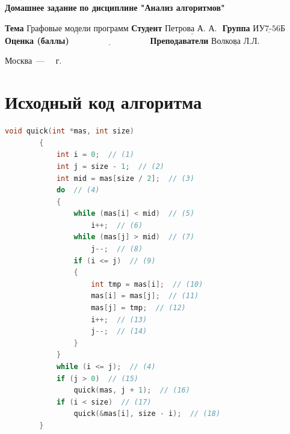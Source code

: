\documentclass[12pt]{report}
\begin{document}
\begin{titlepage}
		
		\begin{center}
			\noindent\begin{minipage}{1.3\textwidth}\centering
				\Large\textbf{Домашнее задание}\newline
				\textbf{по дисциплине "Анализ алгоритмов"}\newline\newline
			\end{minipage}
		\end{center}
		
		\noindent\textbf{Тема} $\underline{\text{Графовые модели программ}}$\newline\newline
		\noindent\textbf{Студент} $\underline{\text{Петрова А. А. }}$\newline\newline
		\noindent\textbf{Группа} $\underline{\text{ИУ7-56Б}}$\newline\newline
		\noindent\textbf{Оценка (баллы)} $\underline{\text{~~~~~~~~~~~~~~~~~~~~~~~~~~~}}$\newline\newline
		\noindent\textbf{Преподаватели} $\underline{\text{Волкова Л.Л.}}$\newline\newline\newline
		
		\begin{center}
			\vfill
			Москва~---~\the\year
			~г.
		\end{center}
	\end{titlepage}
	
	
	\tableofcontents
	
	\newpage
	\chapter{Исходный код алгоритма}
	
	\begin{lstlisting}[label=some-code,caption=Функция быстрой сортировки массива целых чисел, language=C]
		void quick(int *mas, int size)
		{
			int i = 0;  // (1)
			int j = size - 1;  // (2)
			int mid = mas[size / 2];  // (3)
			do  // (4)
			{
				while (mas[i] < mid)  // (5)
					i++;  // (6)
				while (mas[j] > mid)  // (7)
					j--;  // (8)
				if (i <= j)  // (9)
				{
					int tmp = mas[i];  // (10)
					mas[i] = mas[j];  // (11)
					mas[j] = tmp;  // (12)
					i++;  // (13)
					j--;  // (14)
				}
			}
			while (i <= j);  // (4)
			if (j > 0)  // (15)
				quick(mas, j + 1);  // (16)
			if (i < size)  // (17)
				quick(&mas[i], size - i);  // (18)
		}
	\end{lstlisting}
	
\end{document}
